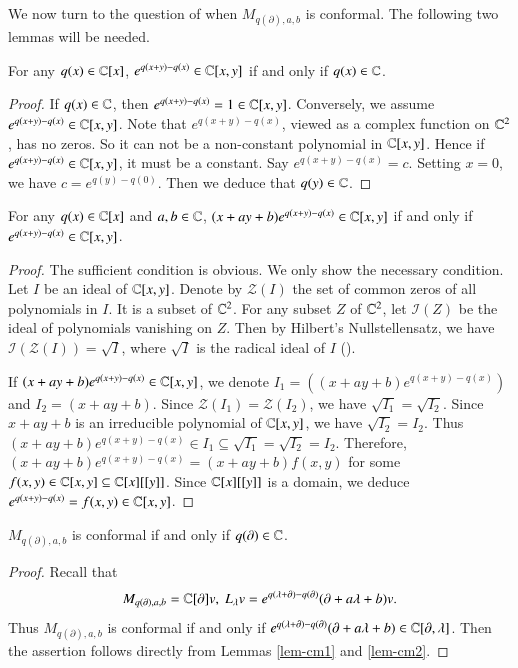 \documentclass[12pt]{amsart}
\begin{document}
We now turn to the question of when $M_{q(\partial),a,b}$ is conformal. The following two lemmas will be needed.
\begin{lem}\label{lem-cm1}
For any $q(x)\in\mathbb{C}[x]$,
$e^{q(x+y)-q(x)}\in\mathbb{C}[x,y]$ if and only if $q(x)\in\mathbb{C}$.
\end{lem}
%
\begin{proof}If $q(x)\in\mathbb{C}$, then $e^{q(x+y)-q(x)}=1\in\mathbb{C}[x,y]$. Conversely, we assume $e^{q(x+y)-q(x)}\in\mathbb{C}[x,y]$.
Note that $e^{q(x+y)-q(x)}$, viewed as a complex function on $\mathbb{C}^2$, has no zeros. So it can not be a non-constant polynomial in $\mathbb{C}[x,y]$.
Hence if $e^{q(x+y)-q(x)}\in\mathbb{C}[x,y]$, it must be a constant.
Say $e^{q(x+y)-q(x)}=c$. %
Setting $x=0$, we have $c=e^{q(y)-q(0)}$. Then we deduce that $q(y)\in \mathbb{C}$.
\end{proof}

\begin{lem}\label{lem-cm2}For any $q(x)\in\mathbb{C}[x]$ and $a,b\in\mathbb{C}$,
$(x+ay+b)e^{q(x+y)-q(x)}\in\mathbb{C}[x,y]$ if and only if $e^{q(x+y)-q(x)}\in\mathbb{C}[x,y]$.
\end{lem}
\begin{proof}
The sufficient condition is obvious. We only show the necessary condition.
Let $I$ be an ideal of $\mathbb{C}[x,y]$.
Denote by  $\mathcal{Z}(I)$ the set of common zeros of all polynomials in $I$. It is a subset of $\mathbb{C}^2$.
For any subset $Z$ of $\mathbb{C}^2$, let $\mathcal{I}(Z)$ be the ideal of polynomials vanishing on $Z$. Then by Hilbert's Nullstellensatz, we have $\mathcal{I}(\mathcal{Z}(I))=\sqrt{I}$, where $\sqrt{I}$ is the radical ideal of $I$ (\cite{AM}).

If $(x+ay+b)e^{q(x+y)-q(x)}\in\mathbb{C}[x,y]$, we denote $I_1=((x+ay+b)e^{q(x+y)-q(x)})$ and $I_2=(x+ay+b)$. Since $\mathcal{Z}(I_1)=\mathcal{Z}(I_2)$, we have $\sqrt{I_1}=\sqrt{I_2}$. Since $x+ay+b$ is an irreducible polynomial of $\mathbb{C}[x,y]$, we have $\sqrt{I_2}=I_2$. Thus $(x+ay+b)e^{q(x+y)-q(x)}\in I_1\subseteq \sqrt{I_1}=\sqrt{I_2}=I_2$.
Therefore, $(x+ay+b)e^{q(x+y)-q(x)}=(x+ay+b)f(x,y)$ for some $f(x,y)\in\mathbb{C}[x,y]\subseteq \mathbb{C}[x][[y]]$. Since $\mathbb{C}[x][[y]]$ is a domain, we deduce $e^{q(x+y)-q(x)}=f(x,y)\in \mathbb{C}[x,y]$.
\end{proof}
\begin{pro}\label{pro-cm}
$M_{q(\partial),a,b}$ is conformal if and only if $q(\partial)\in\mathbb{C}$.
\end{pro}
\begin{proof}Recall that \begin{eqnarray}
M_{q(\partial),a,b}=\mathbb{C}[\partial] v, \
L_\lambda v=e^{q(\lambda+\partial)-q(\partial)}(\partial+a\lambda+b)v.
\end{eqnarray}
Thus $M_{q(\partial),a,b}$ is conformal if and only if $e^{q(\lambda+\partial)-q(\partial)}(\partial+a\lambda+b)\in\mathbb{C}[\partial,\lambda]$. Then the assertion follows directly from Lemmas \ref{lem-cm1} and \ref{lem-cm2}.
\end{proof}
\end{document}

